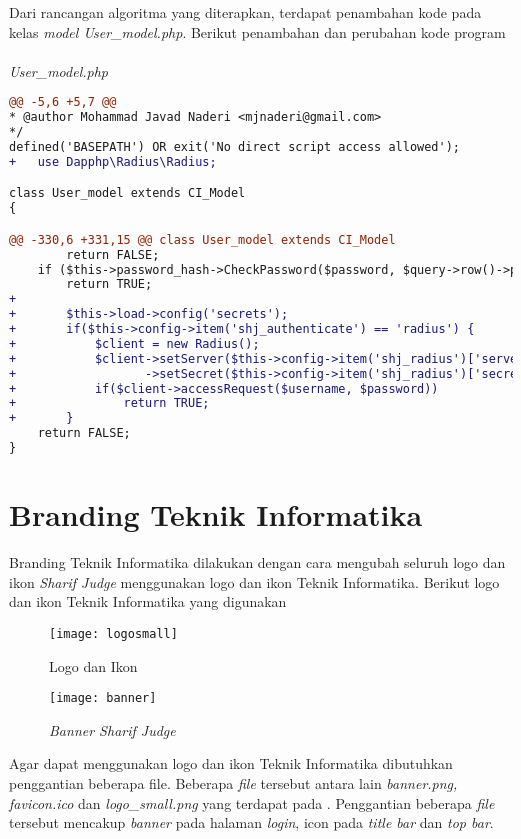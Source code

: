 Dari rancangan algoritma yang diterapkan, terdapat penambahan kode pada kelas \textit{model User\_model.php}. Berikut penambahan dan perubahan kode program
~\\
\textit{User\_model.php}
\begin{lstlisting}[language=diff, basicstyle=\ttfamily, frame=single,
columns=fullflexible, keepspaces=true, breaklines=true]
@@ -5,6 +5,7 @@
* @author Mohammad Javad Naderi <mjnaderi@gmail.com>
*/
defined('BASEPATH') OR exit('No direct script access allowed');
+   use Dapphp\Radius\Radius;

class User_model extends CI_Model
{

@@ -330,6 +331,15 @@ class User_model extends CI_Model
		return FALSE;
	if ($this->password_hash->CheckPassword($password, $query->row()->password))
		return TRUE;
+  
+   	$this->load->config('secrets');
+       if($this->config->item('shj_authenticate') == 'radius') {
+       	$client = new Radius();
+           $client->setServer($this->config->item('shj_radius')['server']) // RADIUS server address
+                  ->setSecret($this->config->item('shj_radius')['secret']);
+           if($client->accessRequest($username, $password))
+           	return TRUE;
+       }
	return FALSE;
}
\end{lstlisting}

\section{Branding Teknik Informatika}
Branding Teknik Informatika dilakukan dengan cara mengubah seluruh logo dan ikon \textit{Sharif Judge} menggunakan logo dan ikon Teknik Informatika. Berikut logo dan ikon Teknik Informatika yang digunakan

\begin{figure}[H]
	\centering  
	\texttt{[image: logosmall]}  
	\caption[Logo dan Ikon]{Logo dan Ikon} 
	\label{fig:logosmall} 
\end{figure} 

\begin{figure}[H]
	\centering  
	\texttt{[image: banner]}  
	\caption[\textit{Banner Sharif Judge}]{\textit{Banner Sharif Judge}} 
	\label{fig:banner} 
\end{figure} 

Agar dapat menggunakan logo dan ikon Teknik Informatika dibutuhkan penggantian beberapa file. Beberapa \textit{file} tersebut antara lain \textit{banner.png, favicon.ico} dan \textit{logo\_small.png} yang terdapat pada . Penggantian beberapa \textit{file} tersebut mencakup \textit{banner} pada halaman \textit{login}, icon pada \textit{title bar} dan \textit{top bar}.

